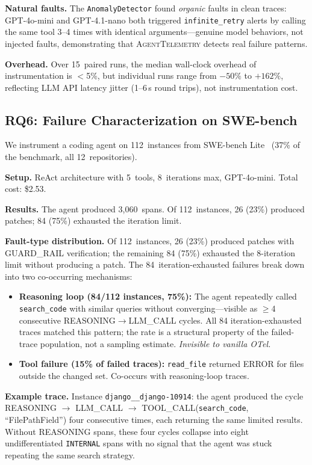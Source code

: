 \documentclass{article}
\begin{document}
\textbf{Natural faults.}
The \texttt{AnomalyDetector} found \emph{organic} faults in clean
traces: GPT-4o-mini and GPT-4.1-nano both triggered
\texttt{infinite\_retry} alerts by calling the same tool 3--4 times
with identical arguments---genuine model behaviors, not injected faults,
demonstrating that \textsc{AgentTelemetry} detects real failure patterns.

\textbf{Overhead.}
Over 15~paired runs, the median wall-clock overhead of instrumentation
is $<$5\%, but individual runs range from $-50\%$ to $+162\%$,
reflecting LLM API latency jitter (1--6\,s round trips), not
instrumentation cost.

\subsection{RQ6: Failure Characterization on SWE-bench}
\label{sec:rq6}

We instrument a coding agent on 112~instances from SWE-bench
Lite~\citep{swebench} (37\% of the benchmark, all 12~repositories).

\textbf{Setup.}  ReAct architecture with 5~tools, 8~iterations max,
GPT-4o-mini.  Total cost: \$2.53.

\textbf{Results.}  The agent produced 3,060~spans.  Of 112~instances,
26 (23\%) produced patches; 84 (75\%) exhausted the iteration limit.

\textbf{Fault-type distribution.}
Of 112~instances, 26 (23\%) produced patches with GUARD\_RAIL
verification; the remaining 84 (75\%) exhausted the 8-iteration limit
without producing a patch.  The 84~iteration-exhausted failures break
down into two co-occurring mechanisms:
\begin{itemize}[nosep]
\item \textbf{Reasoning loop (84/112 instances, 75\%):} The agent
  repeatedly called \texttt{search\_code} with similar queries without
  converging---visible as $\geq$4 consecutive REASONING$\to$LLM\_CALL
  cycles.  All 84 iteration-exhausted traces matched this pattern; the
  rate is a structural property of the failed-trace population, not a
  sampling estimate.  \emph{Invisible to vanilla OTel.}
\item \textbf{Tool failure (15\% of failed traces):} \texttt{read\_file}
  returned ERROR for files outside the changed set.  Co-occurs with
  reasoning-loop traces.
\end{itemize}

\textbf{Example trace.}  Instance \texttt{django\_\_django-10914}: the
agent produced the cycle REASONING $\to$ LLM\_CALL $\to$
TOOL\_CALL(\texttt{search\_code}, ``FilePathField'') four consecutive
times, each returning the same limited results.  Without REASONING
spans, these four cycles collapse into eight undifferentiated
\texttt{INTERNAL} spans with no signal that the agent was stuck
repeating the same search strategy.
\end{document}
